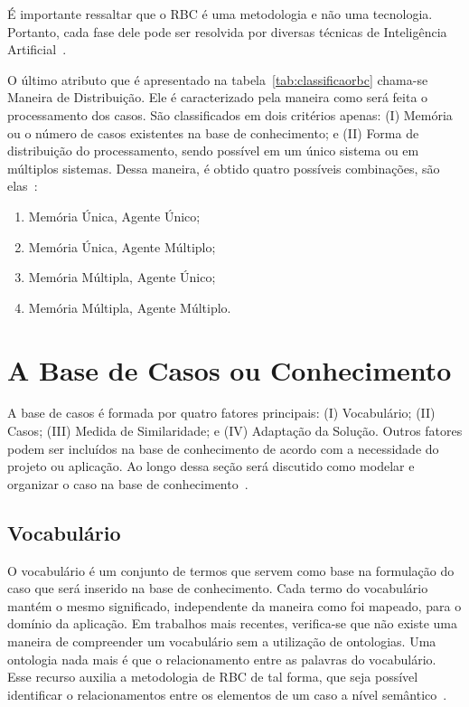 É importante ressaltar que o RBC é uma metodologia e não uma tecnologia. Portanto, cada fase dele pode ser resolvida por diversas técnicas de Inteligência Artificial~\cite{Lopez:2013}.

O último atributo que é apresentado na tabela~\ref{tab:classificaorbc} chama-se Maneira de Distribuição. Ele é caracterizado pela maneira como será feita o processamento dos casos. São classificados em dois critérios apenas: (I) Memória ou o número de casos existentes na base de conhecimento; e (II) Forma de distribuição do processamento, sendo possível em um único sistema ou em múltiplos sistemas. Dessa maneira, é obtido quatro possíveis combinações, são elas~\cite{Lopez:2013}:

\begin{enumerate}
	\item Memória Única, Agente Único;
	\item Memória Única, Agente Múltiplo;
	\item Memória Múltipla, Agente Único;
	\item Memória Múltipla, Agente Múltiplo.
\end{enumerate}

\section{A Base de Casos ou Conhecimento}
\label{sec:basecasos}

A base de casos é formada por quatro fatores principais: (I) Vocabulário; (II) Casos; (III) Medida de Similaridade; e (IV) Adaptação da Solução. Outros fatores podem ser incluídos na base de conhecimento de acordo com a necessidade do projeto ou aplicação. Ao longo dessa seção será discutido como modelar e organizar o caso na base de conhecimento~\cite{Lopez:2013}.

\subsection{Vocabulário}
\label{sec:vocabulario}

O vocabulário é um conjunto de termos que servem como base na formulação do caso que será inserido na base de conhecimento. Cada termo do vocabulário mantém o mesmo significado, independente da maneira como foi mapeado, para o domínio da aplicação. Em trabalhos mais recentes, verifica-se que não existe uma maneira de compreender um vocabulário sem a utilização de ontologias. Uma ontologia nada mais é que o relacionamento entre as palavras do vocabulário. Esse recurso auxilia a metodologia de RBC de tal forma, que seja possível identificar o relacionamentos entre os elementos de um caso a nível semântico~\cite{Lopez:2013}.

